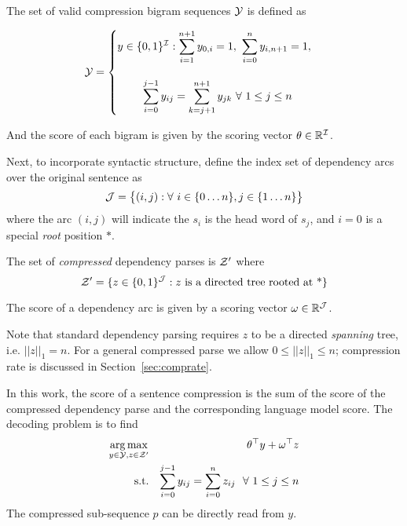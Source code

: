 \documentclass[11pt]{article}
\DeclareMathOperator*{\argmax}{arg\,max}
\newcommand{\Enum}[1]{\{1 \ldots #1\}}
\newcommand{\EnumS}[2]{\{#1 \ldots #2\}}
\newcommand{\Set}[1]{\big\{ #1 \big\}}
\newcommand{\Bin}[1]{\{0,1\}^{#1}}
\newcommand{\Reals}{\mathbb{R}}
\newcommand{\IndexSet}{{\cal I}}
\newcommand{\IndexSetB}{{\cal J}}
\begin{document}
The set of valid compression bigram sequences ${\cal Y}$ is defined as
 
\begin{equation*}
  {\cal Y} = \begin{cases}\displaystyle y \in \Bin{\IndexSet} : 
    \sum_{i=1}^{n+1} y_{0,i} = 1,\ \sum_{i=0}^n y_{i, n+1} = 1, \\\\
    \displaystyle\ \ \ \ \ \ \
    \sum_{i=0}^{j-1} y_{ij} = \sum_{k=j+1}^{n+1} y_{jk}\  \forall\ 1\leq j \leq n  \end{cases}
\end{equation*}

\noindent And the score of each bigram is given by the scoring vector $\theta \in \Reals^{\IndexSet}$.






Next, to incorporate syntactic structure, define the index set of dependency arcs over the
original sentence as
\[ \IndexSetB = \Set{(i,j) : \forall \  i \in \EnumS{0}{n}, j \in \Enum{n} } \]
\noindent where the arc $(i,j)$ will indicate the $s_i$ is the head word of $s_j$, and $i=0$ is a 
special \textit{root} position $*$.    

The set of \textit{compressed} dependency parses is ${\cal Z}'$ where
\[{\cal Z }' = \{z \in \Bin{\IndexSetB}: z \hbox{ is a directed tree rooted at *} \}  \]

\noindent 
The score of a dependency arc is given by a scoring vector $\omega \in
\Reals^{\IndexSetB}$.


Note that standard dependency parsing requires $z$ to be a directed
\textit{spanning} tree, i.e. $||z||_1 = n$. For a general compressed
parse we allow $0 \leq ||z||_1 \leq n$; compression rate is discussed in 
Section~\ref{sec:comprate}.   



In this work, the score of a sentence compression is the
sum of the score of the compressed dependency parse and the
corresponding language model score. The decoding problem is to find
\begin{eqnarray*}
 \argmax_{y \in {\cal Y}, z\in {\cal Z}'} &&\theta^\top y +  \omega^\top z \\
\mathrm{s.t.} &&  \sum_{i = 0}^{j-1} y_{i j} =  \sum_{i=0}^n z_{i j} \ \ \forall\  1 \leq j \leq n 
\end{eqnarray*}
\noindent The compressed sub-sequence $p$ can be directly read from $y$. 
\end{document}
